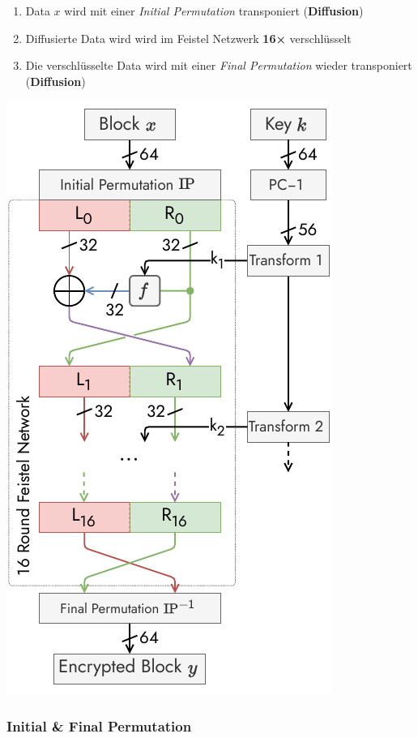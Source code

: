 \documentclass[
  10pt,
  a4paper,
  twocolumn]{article}
\providecommand{\tightlist}{%
  \setlength{\itemsep}{0pt}\setlength{\parskip}{0pt}}\usepackage{longtable,booktabs,array}
\begin{document}
\begin{enumerate}
\def\labelenumi{\arabic{enumi}.}
\tightlist
\item
  Data \(x\) wird mit einer \emph{Initial Permutation} transponiert
  (\textbf{Diffusion})
\item
  Diffusierte Data wird wird im Feistel Netzwerk \textbf{16×}
  verschlüsselt
\item
  Die verschlüsselte Data wird mit einer \emph{Final Permutation} wieder
  transponiert (\textbf{Diffusion})
\end{enumerate}

\begin{center}
\includegraphics{images/crypto/des_detailed.pdf}
\end{center}

\subsubsection{Initial \& Final
Permutation}\label{initial-final-permutation}
\end{document}
